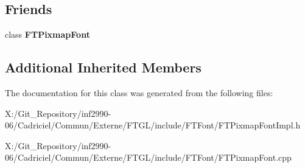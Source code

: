 \subsection*{Friends}
\begin{DoxyCompactItemize}
\item 
\hypertarget{class_f_t_pixmap_font_impl_ac7f382db9ff9f02888b67b7434d7edd4}{class {\bfseries F\-T\-Pixmap\-Font}}\label{class_f_t_pixmap_font_impl_ac7f382db9ff9f02888b67b7434d7edd4}

\end{DoxyCompactItemize}
\subsection*{Additional Inherited Members}


The documentation for this class was generated from the following files\-:\begin{DoxyCompactItemize}
\item 
X\-:/\-Git\-\_\-\-Repository/inf2990-\/06/\-Cadriciel/\-Commun/\-Externe/\-F\-T\-G\-L/include/\-F\-T\-Font/F\-T\-Pixmap\-Font\-Impl.\-h\item 
X\-:/\-Git\-\_\-\-Repository/inf2990-\/06/\-Cadriciel/\-Commun/\-Externe/\-F\-T\-G\-L/include/\-F\-T\-Font/F\-T\-Pixmap\-Font.\-cpp\end{DoxyCompactItemize}
